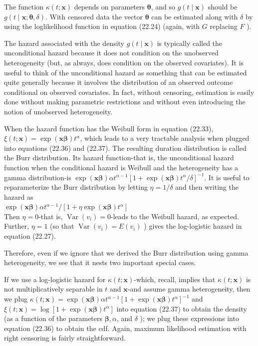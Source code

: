 \documentclass[10pt]{article}
\begin{document}
The function $\kappa(t ; \mathbf{x})$ depends on parameters $\boldsymbol{\theta}$, and so $g(t \mid \mathbf{x})$ should be $g(t \mid \mathbf{x} ; \boldsymbol{\theta}, \delta)$. With censored data the vector $\boldsymbol{\theta}$ can be estimated along with $\delta$ by using the loglikelihood function in equation (22.24) (again, with $G$ replacing $F$ ).

The hazard associated with the density $g(t \mid \mathbf{x})$ is typically called the unconditional hazard because it does not condition on the unobserved heterogeneity (but, as always, does condition on the observed covariates). It is useful to think of the unconditional hazard as something that can be estimated quite generally because it involves the distribution of an observed outcome conditional on observed covariates. In fact, without censoring, estimation is easily done without making parametric restrictions and without even introducing the notion of unobserved heterogeneity.

When the hazard function has the Weibull form in equation (22.33), $\xi(t ; \mathbf{x})= \exp (\mathbf{x} \boldsymbol{\beta}) t^{\alpha}$, which leads to a very tractable analysis when plugged into equations (22.36) and (22.37). The resulting duration distribution is called the Burr distribution. Its hazard function-that is, the unconditional hazard function when the conditional hazard is Weibull and the heterogeneity has a gamma distribution-is $\exp (\mathbf{x} \boldsymbol{\beta}) \alpha t^{\alpha-1}\left[1+\exp (\mathbf{x} \boldsymbol{\beta}) t^{\alpha} / \delta\right]^{-1}$. It is useful to reparameterize the Burr distribution by letting $\eta=1 / \delta$ and then writing the hazard as\\
$\exp (\mathbf{x} \boldsymbol{\beta}) \alpha t^{\alpha-1} /\left[1+\eta \exp (\mathbf{x} \boldsymbol{\beta}) t^{\alpha}\right]$\\
Then $\eta=0$-that is, $\operatorname{Var}\left(v_{i}\right)=0$-leads to the Weibull hazard, as expected. Further, $\eta=1$ (so that $\operatorname{Var}\left(v_{i}\right)=E\left(v_{i}\right)$ ) gives the log-logistic hazard in equation (22.27).

Therefore, even if we ignore that we derived the Burr distribution using gamma heterogeneity, we see that it nests two important special cases.

If we use a log-logistic hazard for $\kappa(t ; \mathbf{x})$-which, recall, implies that $\kappa(t ; \mathbf{x})$ is not multiplicatively separable in $t$ and $\mathbf{x}$-and assume gamma heterogeneity, then we plug $\kappa(t ; \mathbf{x})=\exp (\mathbf{x} \boldsymbol{\beta}) \alpha t^{\alpha-1}\left[1+\exp (\mathbf{x} \boldsymbol{\beta}) t^{\alpha}\right]^{-1}$ and $\xi(t ; \mathbf{x})=\log \left[1+\exp (\mathbf{x} \boldsymbol{\beta}) t^{\alpha}\right]$ into equation (22.37) to obtain the density (as a function of the parameters $\boldsymbol{\beta}, \alpha$, and $\delta$ ); we plug these expressions into equation (22.36) to obtain the cdf. Again, maximum likelihood estimation with right censoring is fairly straightforward.
\end{document}
